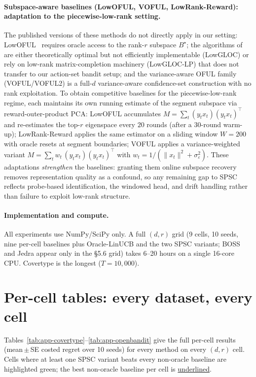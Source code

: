 \documentclass{article}
\begin{document}
\paragraph{Subspace-aware baselines (LowOFUL, VOFUL, LowRank-Reward): adaptation to the piecewise-low-rank setting.}
The published versions of these methods do not directly apply in our
setting: LowOFUL~\citep{jun2019bilinear} requires oracle access to
the rank-$r$ subspace $B^\star$; the algorithms of \citet{lu2021low}
are either theoretically optimal but not efficiently implementable
(LowGLOC) or rely on low-rank matrix-completion machinery
(LowGLOC-LP) that does not transfer to our action-set bandit setup;
and the variance-aware OFUL family (VOFUL/VOFUL2) is a full-$d$
variance-aware confidence-set construction with no rank exploitation.
To obtain competitive baselines for the piecewise-low-rank regime,
each maintains its own running estimate of the segment subspace via
reward-outer-product PCA: LowOFUL accumulates
$M = \sum_t (y_t x_t)(y_t x_t)^\top$ and re-estimates the top-$r$
eigenspace every $20$ rounds (after a $30$-round warm-up);
LowRank-Reward applies the same estimator on a sliding window
$W{=}200$ with oracle resets at segment boundaries; VOFUL applies a
variance-weighted variant
$M = \sum_t w_t\,(y_t x_t)(y_t x_t)^\top$ with
$w_t = 1/(\|x_t\|^2 + \sigma_\varepsilon^2)$. These adaptations
\emph{strengthen} the baselines: granting them online subspace
recovery removes representation quality as a confound, so any
remaining gap to SPSC reflects probe-based identification, the
windowed head, and drift handling rather than failure to exploit
low-rank structure.

\paragraph{Implementation and compute.}
All experiments use NumPy/SciPy only. A full $(d,r)$ grid (9 cells,
10 seeds, nine per-cell baselines plus Oracle-LinUCB and the two
SPSC variants; BOSS and Jedra appear only in the §5.6 grid)
takes 6--20 hours on a single 16-core CPU. Covertype is the longest
($T{=}10{,}000$).

\section{Per-cell tables: every dataset, every cell}
\label{app:percell}

Tables~\ref{tab:app-covertype}--\ref{tab:app-openbandit} give the
full per-cell results (mean\,$\pm$\,SE costed regret over 10 seeds) for
every method on every $(d,r)$ cell. Cells where at least one SPSC
variant beats every non-oracle baseline are highlighted
\colorbox{green!12}{green}; the best non-oracle baseline per cell is
\underline{underlined}.
\end{document}
